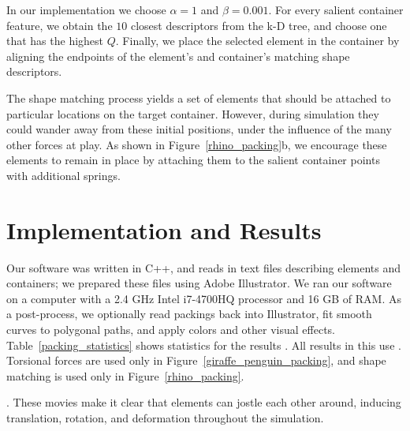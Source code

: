 In our implementation we choose $\alpha = 1$ and $\beta = 0.001$.
For every salient container feature, we obtain the $10$ closest descriptors from the k-D tree, 
and choose one that has the highest $Q$.
Finally, we place the selected element in the container by 
aligning the endpoints of the element's and container's matching shape 
descriptors.

The shape matching process yields a set of elements that should be attached
to particular locations on the target container.  However, during simulation
they could wander away from these initial positions, under the influence of
the many other forces at play.  As shown in Figure~\ref{rhino_packing}b, we
encourage these elements to remain in place by attaching them to the salient
container points with additional springs.

\section{Implementation and Results}
\label{repulsionpak_results}

Our software was written in C++, and reads in text files describing
elements and containers; we prepared these files using
Adobe Illustrator.  We ran
our software on a computer with a 2.4 GHz Intel i7-4700HQ processor
and 16 GB of RAM.  As a post-process, we optionally read packings
back into Illustrator, fit smooth curves to polygonal paths, and
apply colors and other visual effects.  Table~\ref{packing_statistics}
shows statistics for the results .  All results in this
 use .
Torsional forces are used only in Figure~\ref{giraffe_penguin_packing},
and shape matching is used only in Figure~\ref{rhino_packing}.

.  
These movies make it clear that elements can jostle each other
around, inducing translation, rotation, and deformation throughout the 
simulation.




